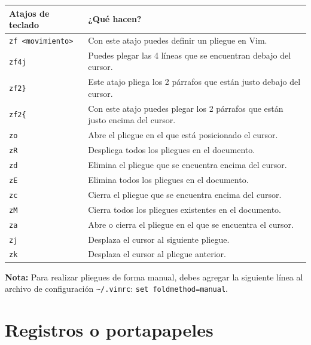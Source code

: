 \documentclass[
  doc,
  floatsintext,
  longtable,
  a4paper,
  nolmodern,
  notxfonts,
  notimes,
  12pt,
  colorlinks=true,linkcolor=blue,citecolor=blue,urlcolor=blue]{apa7}
\newcounter{none} %
\begin{document}
{\def\LTcaptype{none} %
\begin{longtable}[]{@{}
  >{\raggedright\arraybackslash}p{}
  >{\raggedright\arraybackslash}p{}@{}}
\toprule\noalign{}
\begin{minipage}[b]{\linewidth}\raggedright
Atajos de teclado
\end{minipage} & \begin{minipage}[b]{\linewidth}\raggedright
¿Qué hacen?
\end{minipage} \\
\midrule\noalign{}
\endhead
\bottomrule\noalign{}
\endlastfoot
\texttt{zf\ \textless{}movimiento\textgreater{}} & Con este atajo puedes
definir un pliegue en Vim. \\
\texttt{zf4j} & Puedes plegar las 4 líneas que se encuentran debajo del
cursor. \\
\texttt{zf2\}} & Este atajo pliega los 2 párrafos que están justo debajo
del cursor. \\
\texttt{zf2\{} & Con este atajo puedes plegar los 2 párrafos que están
justo encima del cursor. \\
\texttt{zo} & Abre el pliegue en el que está posicionado el cursor. \\
\texttt{zR} & Despliega todos los pliegues en el documento. \\
\texttt{zd} & Elimina el pliegue que se encuentra encima del cursor. \\
\texttt{zE} & Elimina todos los pliegues en el documento. \\
\texttt{zc} & Cierra el pliegue que se encuentra encima del cursor. \\
\texttt{zM} & Cierra todos los pliegues existentes en el documento. \\
\texttt{za} & Abre o cierra el pliegue en el que se encuentra el
cursor. \\
\texttt{zj} & Desplaza el cursor al siguiente pliegue. \\
\texttt{zk} & Desplaza el cursor al pliegue anterior. \\
\end{longtable}
}

\textbf{Nota:} Para realizar pliegues de forma manual, debes agregar la
siguiente línea al archivo de configuración
\texttt{\textasciitilde{}/.vimrc}: \texttt{set\ foldmethod=manual}.

\section{Registros o portapapeles}\label{registros-o-portapapeles}
\end{document}
